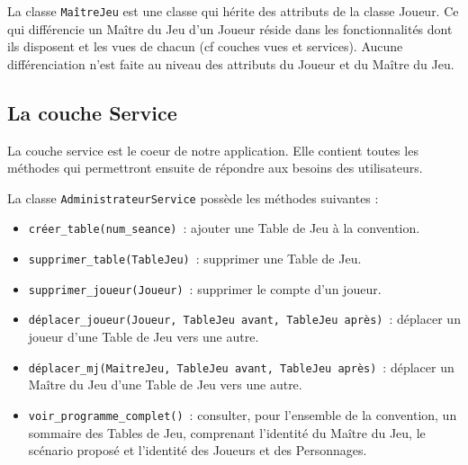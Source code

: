 \documentclass[11pt]{article}
\begin{document}
\bigbreak

La classe \texttt{MaîtreJeu} est une classe qui hérite des attributs de la classe Joueur. Ce qui différencie un Maître du Jeu d'un Joueur réside dans les fonctionnalités dont ils disposent et les vues de chacun (cf couches vues et services). Aucune différenciation n'est faite au niveau des attributs du Joueur et du Maître du Jeu.







\subsection{La couche Service}

La couche service est le coeur de notre application. Elle contient toutes les méthodes qui permettront ensuite de répondre aux besoins des utilisateurs.




\bigbreak


La classe \texttt{AdministrateurService} possède les méthodes suivantes :
\begin{itemize}[label=, font=\small]
    \item \texttt{créer\_table(num\_seance)}~: ajouter une Table de Jeu à la convention.
    \item \texttt{supprimer\_table(TableJeu)}~: supprimer une Table de Jeu.
    \item \texttt{supprimer\_joueur(Joueur)}~: supprimer le compte d'un joueur.
    \item \texttt{déplacer\_joueur(Joueur, TableJeu avant, TableJeu après)}~: déplacer un joueur d'une Table de Jeu vers une autre.
    \item \texttt{déplacer\_mj(MaitreJeu, TableJeu avant, TableJeu après)}~: déplacer un Maître du Jeu d'une Table de Jeu vers une autre.
    \item \texttt{voir\_programme\_complet()}~: consulter, pour l'ensemble de la convention, un sommaire des Tables de Jeu, comprenant l'identité du Maître du Jeu, le scénario proposé et l'identité des Joueurs et des Personnages.
\end{itemize}

\bigbreak
\end{document}
